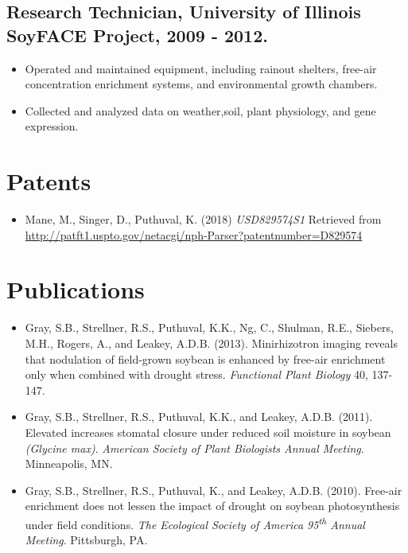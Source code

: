 \documentclass[letterpaper]{article}
\begin{document}
  \subsection*{Research Technician, University of Illinois SoyFACE Project, 2009 - 2012.}

    \begin{itemize}

      \item Operated and maintained equipment, including rainout shelters, free-air concentration enrichment systems, and environmental growth chambers.
      \item Collected and analyzed data on weather,soil, plant physiology, and gene expression.

    \end{itemize}

\section*{Patents}

  \begin{itemize}
    \item Mane, M., Singer, D., Puthuval, K. (2018) {\it USD829574S1} Retrieved from \href{http://patft1.uspto.gov/netacgi/nph-Parser?patentnumber=D829574}{http://patft1.uspto.gov/netacgi/nph-Parser?patentnumber=D829574}
  \end{itemize}

\section*{Publications}

  \begin{itemize}

    \item Gray, S.B., Strellner, R.S., Puthuval, K.K., Ng, C., Shulman, R.E., Siebers, M.H., Rogers, A., and Leakey, A.D.B. (2013). Minirhizotron imaging reveals that nodulation of field-grown soybean is enhanced by free-air  enrichment only when combined with drought stress. {\it Functional Plant Biology} 40, 137-147.
    \item Gray, S.B., Strellner, R.S., Puthuval, K.K., and Leakey, A.D.B. (2011). Elevated  increases stomatal closure under reduced soil moisture in soybean {\it(Glycine max)}. {\it American Society of Plant Biologists Annual Meeting}. Minneapolis, MN.
    \item Gray, S.B., Strellner, R.S., Puthuval, K., and Leakey, A.D.B. (2010). Free-air  enrichment does not lessen the impact of drought on soybean photosynthesis under field conditions. {\it The Ecological Society of America 95\textsuperscript{th} Annual Meeting}. Pittsburgh, PA.

  \end{itemize}
\end{document}
